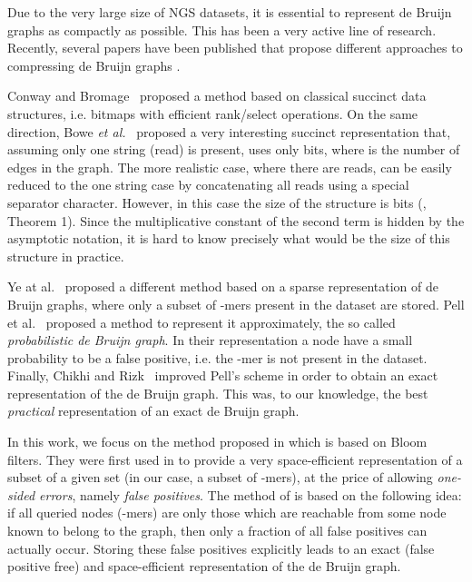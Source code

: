 \documentclass[pdftex]{llncs}\usepackage[T1]{fontenc}
\begin{document}
Due to the very large size of NGS datasets, it is essential to
represent de Bruijn graphs as compactly as possible.  This has been a
very active line of research. Recently, several papers have been
published that propose different approaches to compressing de Bruijn
graphs
\cite{Conway15022011,YeAtAl-BMCBioinfo12,DBLP:conf/wabi/ChikhiR12,DBLP:conf/wabi/BoweOSS12,pmid22847406}.

Conway and Bromage~\cite{Conway15022011} proposed a method based on
classical succinct data structures, i.e. bitmaps with efficient
rank/select operations.  On the same direction, Bowe \emph{et
  al.}~\cite{DBLP:conf/wabi/BoweOSS12} proposed a very interesting
succinct representation that, assuming only one string (read) is
present, uses only  bits, where  is the number of edges in the
graph. The more realistic case, where there are  reads, can be
easily reduced to the one string case by concatenating all  reads
using a special separator character. However, in this case the size of
the structure is  bits
(\cite{DBLP:conf/wabi/BoweOSS12}, Theorem 1). Since the multiplicative
constant of the second term is hidden by the asymptotic notation, it
is hard to know precisely what would be the size of this structure in
practice.

Ye at al.~\cite{YeAtAl-BMCBioinfo12} proposed a different method based
on a sparse representation of de Bruijn graphs, where only a subset of
-mers present in the dataset are stored. Pell et
al.~\cite{pmid22847406} proposed a method to represent it
approximately, the so called \emph{probabilistic de Bruijn graph}. In
their representation a node have a small probability to be a false
positive, i.e. the -mer is not present in the dataset. Finally,
Chikhi and Rizk~\cite{DBLP:conf/wabi/ChikhiR12} improved Pell's scheme
in order to obtain an exact representation of the de Bruijn
graph. This was, to our knowledge, the best \emph{practical}
representation of an exact de Bruijn graph.

In this work, we focus on the method proposed in
\cite{DBLP:conf/wabi/ChikhiR12} which is based on Bloom filters.  They
were first used in \cite{pmid22847406} to provide a very
space-efficient representation of a subset of a given set (in our
case, a subset of -mers), at the price of allowing {\em one-sided
  errors}, namely {\em false positives}. The method of
\cite{DBLP:conf/wabi/ChikhiR12} is based on the following idea: if all
queried nodes (-mers) are only those which are reachable from some
node known to belong to the graph, then only a fraction of all false
positives can actually occur. Storing these false positives explicitly
leads to an exact (false positive free) and space-efficient
representation of the de Bruijn graph.
\end{document}
